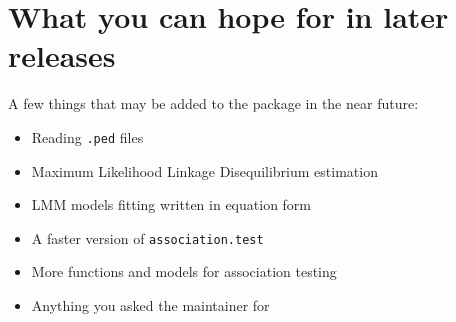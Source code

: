 \documentclass{article}\usepackage[]{graphicx}\usepackage[]{color}
\begin{document}
\vfill\eject
\section{What you can hope for in later releases}

A few things that may be added to the package in the near future:

\begin{itemize}
\item Reading \verb!.ped! files
\item Maximum Likelihood Linkage Disequilibrium estimation
\item LMM models fitting written in equation form
\item A faster version of \verb!association.test!
\item More functions and models for association testing
\item Anything you asked the maintainer for
\end{itemize}
\end{document}
